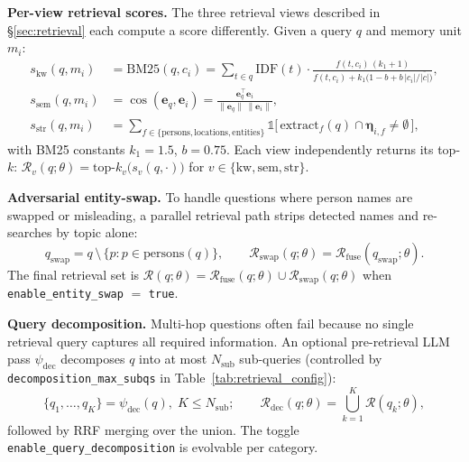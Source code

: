\noindent \textbf{Per-view retrieval scores.} The three retrieval views described in \S\ref{sec:retrieval} each compute a score differently. Given a query $q$ and memory unit $m_i$:
\begin{align}
    s_{\text{kw}}(q, m_i) &= \mathrm{BM25}(q, c_i) = \sum_{t \in q} \mathrm{IDF}(t)\cdot\frac{f(t,c_i)\,(k_1{+}1)}{f(t,c_i) + k_1\bigl(1 - b + b\,|c_i|/\overline{|c|}\bigr)}, \label{eq:bm25}\\
    s_{\text{sem}}(q, m_i) &= \cos(\mathbf{e}_q, \mathbf{e}_i) = \frac{\mathbf{e}_q^{\top}\mathbf{e}_i}{\|\mathbf{e}_q\|\,\|\mathbf{e}_i\|}, \label{eq:sem_cos}\\
    s_{\text{str}}(q, m_i) &= \sum_{f \in \{\text{persons},\text{locations},\text{entities}\}} \mathbb{1}\!\bigl[\,\mathrm{extract}_f(q) \cap \boldsymbol{\eta}_{i,f} \neq \emptyset\,\bigr], \label{eq:str}
\end{align}
with BM25 constants $k_1{=}1.5$, $b{=}0.75$. Each view independently returns its top-$k$: $\mathcal{R}_v(q;\theta) = \mathrm{top}\text{-}k_v\bigl(s_v(q,\cdot)\bigr)$ for $v\in\{\text{kw},\text{sem},\text{str}\}$.

\noindent \textbf{Adversarial entity-swap.} To handle questions where person names are swapped or misleading, a parallel retrieval path strips detected names and re-searches by topic alone:
\begin{equation}
    q_{\text{swap}} = q \,\setminus\, \bigl\{p : p \in \mathrm{persons}(q)\bigr\},
    \qquad
    \mathcal{R}_{\text{swap}}(q;\theta) = \mathcal{R}_{\text{fuse}}(q_{\text{swap}};\theta).
    \label{eq:swap}
\end{equation}
The final retrieval set is $\mathcal{R}(q;\theta) = \mathcal{R}_{\text{fuse}}(q;\theta) \cup \mathcal{R}_{\text{swap}}(q;\theta)$ when \texttt{enable\_entity\_swap} $=$ \texttt{true}.

\noindent \textbf{Query decomposition.} Multi-hop questions often fail because no single retrieval query captures all required information. An optional pre-retrieval LLM pass $\psi_{\text{dec}}$ decomposes $q$ into at most $N_{\text{sub}}$ sub-queries (controlled by \texttt{decomposition\_max\_subqs} in Table~\ref{tab:retrieval_config}):
\begin{equation}
    \{q_1, \ldots, q_{K}\} = \psi_{\text{dec}}(q),\; K \leq N_{\text{sub}}; \qquad
    \mathcal{R}_{\text{dec}}(q;\theta) = \bigcup_{k=1}^{K} \mathcal{R}(q_k;\theta),
    \label{eq:decomp}
\end{equation}
followed by RRF merging over the union. The toggle \texttt{enable\_query\_decomposition} is evolvable per category.

